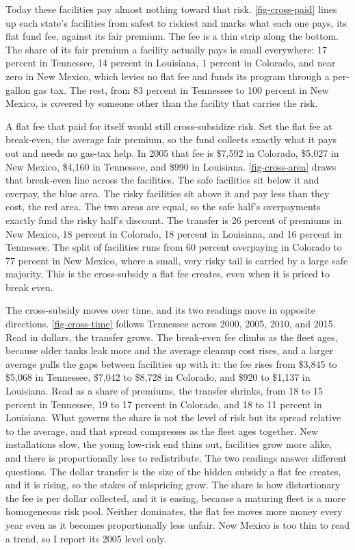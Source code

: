 \documentclass[
  12pt,
]{article}
\begin{document}
Today these facilities pay almost nothing toward that risk.
\autoref{fig-cross-paid} lines up each state's facilities from safest to
riskiest and marks what each one pays, its flat fund fee, against its
fair premium. The fee is a thin strip along the bottom. The share of its
fair premium a facility actually pays is small everywhere: 17 percent in
Tennessee, 14 percent in Louisiana, 1 percent in Colorado, and near zero
in New Mexico, which levies no flat fee and funds its program through a
per-gallon gas tax. The rest, from 83 percent in Tennessee to 100
percent in New Mexico, is covered by someone other than the facility
that carries the risk.

A flat fee that paid for itself would still cross-subsidize risk. Set
the flat fee at break-even, the average fair premium, so the fund
collects exactly what it pays out and needs no gas-tax help. In 2005
that fee is \$7,592 in Colorado, \$5,027 in New Mexico, \$4,160 in
Tennessee, and \$990 in Louisiana. \autoref{fig-cross-area} draws that
break-even line across the facilities. The safe facilities sit below it
and overpay, the blue area. The risky facilities sit above it and pay
less than they cost, the red area. The two areas are equal, so the safe
half's overpayments exactly fund the risky half's discount. The transfer
is 26 percent of premiums in New Mexico, 18 percent in Colorado, 18
percent in Louisiana, and 16 percent in Tennessee. The split of
facilities runs from 60 percent overpaying in Colorado to 77 percent in
New Mexico, where a small, very risky tail is carried by a large safe
majority. This is the cross-subsidy a flat fee creates, even when it is
priced to break even.

The cross-subsidy moves over time, and its two readings move in opposite
directions. \autoref{fig-cross-time} follows Tennessee across 2000,
2005, 2010, and 2015. Read in dollars, the transfer grows. The
break-even fee climbs as the fleet ages, because older tanks leak more
and the average cleanup cost rises, and a larger average pulls the gaps
between facilities up with it: the fee rises from \$3,845 to \$5,068 in
Tennessee, \$7,042 to \$8,728 in Colorado, and \$920 to \$1,137 in
Louisiana. Read as a share of premiums, the transfer shrinks, from 18 to
15 percent in Tennessee, 19 to 17 percent in Colorado, and 18 to 11
percent in Louisiana. What governs the share is not the level of risk
but its spread relative to the average, and that spread compresses as
the fleet ages together. New installations slow, the young low-risk end
thins out, facilities grow more alike, and there is proportionally less
to redistribute. The two readings answer different questions. The dollar
transfer is the size of the hidden subsidy a flat fee creates, and it is
rising, so the stakes of mispricing grow. The share is how distortionary
the fee is per dollar collected, and it is easing, because a maturing
fleet is a more homogeneous risk pool. Neither dominates, the flat fee
moves more money every year even as it becomes proportionally less
unfair. New Mexico is too thin to read a trend, so I report its 2005
level only.
\end{document}
